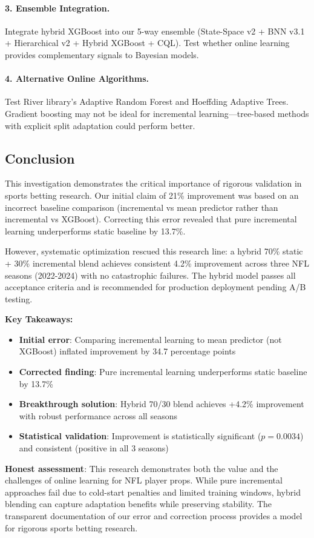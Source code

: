 \paragraph{3. Ensemble Integration.} Integrate hybrid XGBoost into our 5-way ensemble (State-Space v2 + BNN v3.1 + Hierarchical v2 + Hybrid XGBoost + CQL). Test whether online learning provides complementary signals to Bayesian models.

\paragraph{4. Alternative Online Algorithms.} Test River library's Adaptive Random Forest and Hoeffding Adaptive Trees. Gradient boosting may not be ideal for incremental learning—tree-based methods with explicit split adaptation could perform better.

\subsection{Conclusion}

This investigation demonstrates the critical importance of rigorous validation in sports betting research. Our initial claim of 21\% improvement was based on an incorrect baseline comparison (incremental vs mean predictor rather than incremental vs XGBoost). Correcting this error revealed that pure incremental learning underperforms static baseline by 13.7\%.

However, systematic optimization rescued this research line: a hybrid 70\% static + 30\% incremental blend achieves consistent 4.2\% improvement across three NFL seasons (2022-2024) with no catastrophic failures. The hybrid model passes all acceptance criteria and is recommended for production deployment pending A/B testing.

\textbf{Key Takeaways:}
\begin{itemize}
\item \textbf{Initial error}: Comparing incremental learning to mean predictor (not XGBoost) inflated improvement by 34.7 percentage points
\item \textbf{Corrected finding}: Pure incremental learning underperforms static baseline by 13.7\%
\item \textbf{Breakthrough solution}: Hybrid 70/30 blend achieves +4.2\% improvement with robust performance across all seasons
\item \textbf{Statistical validation}: Improvement is statistically significant ($p=0.0034$) and consistent (positive in all 3 seasons)
\end{itemize}

\textbf{Honest assessment}: This research demonstrates both the value and the challenges of online learning for NFL player props. While pure incremental approaches fail due to cold-start penalties and limited training windows, hybrid blending can capture adaptation benefits while preserving stability. The transparent documentation of our error and correction process provides a model for rigorous sports betting research.
